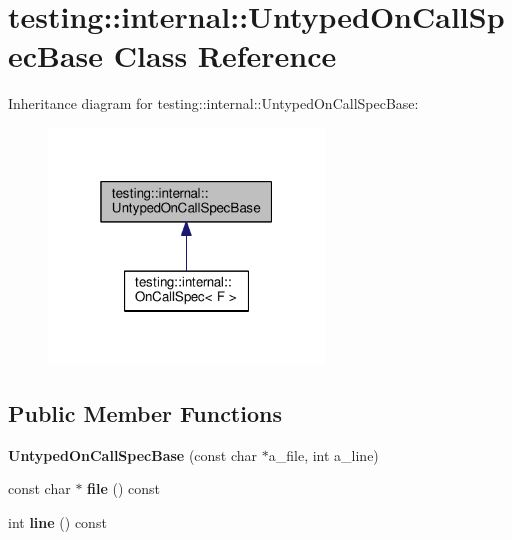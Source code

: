 \hypertarget{classtesting_1_1internal_1_1UntypedOnCallSpecBase}{}\section{testing\+:\+:internal\+:\+:Untyped\+On\+Call\+Spec\+Base Class Reference}
\label{classtesting_1_1internal_1_1UntypedOnCallSpecBase}


Inheritance diagram for testing\+:\+:internal\+:\+:Untyped\+On\+Call\+Spec\+Base\+:\nopagebreak
\begin{figure}[H]
\begin{center}
\leavevmode
\includegraphics[width=208pt]{classtesting_1_1internal_1_1UntypedOnCallSpecBase__inherit__graph}
\end{center}
\end{figure}
\subsection*{Public Member Functions}
\begin{DoxyCompactItemize}
\item 
{\bfseries Untyped\+On\+Call\+Spec\+Base} (const char $\ast$a\+\_\+file, int a\+\_\+line)\hypertarget{classtesting_1_1internal_1_1UntypedOnCallSpecBase_afc5da72d536ad61e2d66de87b2b9bc50}{}\label{classtesting_1_1internal_1_1UntypedOnCallSpecBase_afc5da72d536ad61e2d66de87b2b9bc50}

\item 
const char $\ast$ {\bfseries file} () const \hypertarget{classtesting_1_1internal_1_1UntypedOnCallSpecBase_ae4cb8eb6aa409a4b29a8cc12ec46c5c4}{}\label{classtesting_1_1internal_1_1UntypedOnCallSpecBase_ae4cb8eb6aa409a4b29a8cc12ec46c5c4}

\item 
int {\bfseries line} () const \hypertarget{classtesting_1_1internal_1_1UntypedOnCallSpecBase_a6cabf881d2cae1e270528a823f7d9f7e}{}\label{classtesting_1_1internal_1_1UntypedOnCallSpecBase_a6cabf881d2cae1e270528a823f7d9f7e}

\end{DoxyCompactItemize}
